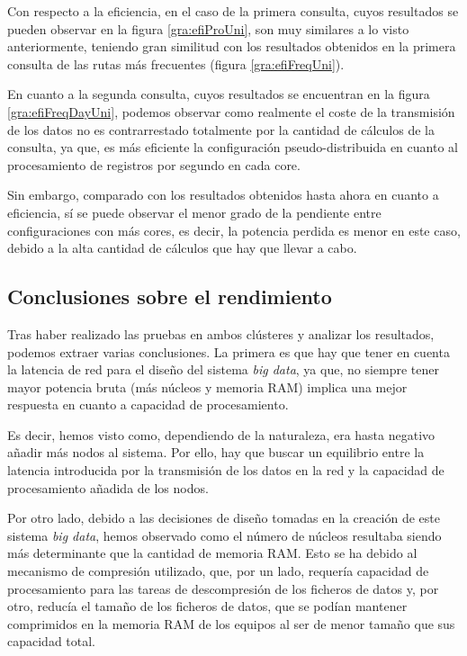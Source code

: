 Con respecto a la eficiencia, en el caso de la primera consulta, cuyos resultados se pueden observar en la figura \ref{gra:efiProUni}, son muy similares a lo visto anteriormente, teniendo gran similitud con los resultados obtenidos en la primera consulta de las rutas más frecuentes (figura \ref{gra:efiFreqUni}).

En cuanto a la segunda consulta, cuyos resultados se encuentran en la figura \ref{gra:efiFreqDayUni}, podemos observar como realmente el coste de la transmisión de los datos no es contrarrestado totalmente por la cantidad de cálculos de la consulta, ya que, es más eficiente la configuración pseudo-distribuida en cuanto al procesamiento de registros por segundo en cada core.

Sin embargo, comparado con los resultados obtenidos hasta ahora en cuanto a eficiencia, sí se puede observar el menor grado de la pendiente entre configuraciones con más cores, es decir, la potencia perdida es menor en este caso, debido a la alta cantidad de cálculos que hay que llevar a cabo.

\subsection{Conclusiones sobre el rendimiento}
Tras haber realizado las pruebas en ambos clústeres y analizar los resultados, podemos extraer varias conclusiones. La primera es que hay que tener en cuenta la latencia de red para el diseño del sistema \textit{big data}, ya que, no siempre tener mayor potencia bruta (más núcleos y memoria RAM) implica una mejor respuesta en cuanto a capacidad de procesamiento.

Es decir, hemos visto como, dependiendo de la naturaleza, era hasta negativo añadir más nodos al sistema. Por ello, hay que buscar un equilibrio entre la latencia introducida por la transmisión de los datos en la red y la capacidad de procesamiento añadida de los nodos.

Por otro lado, debido a las decisiones de diseño tomadas en la creación de este sistema \textit{big data}, hemos observado como el número de núcleos resultaba siendo más determinante que la cantidad de memoria \gls{RAM}. Esto se ha debido al mecanismo de compresión utilizado, que, por un lado, requería capacidad de procesamiento para las tareas de descompresión de los ficheros de datos y, por otro, reducía el tamaño de los ficheros de datos, que se podían mantener comprimidos en la memoria \gls{RAM} de los equipos al ser de menor tamaño que sus capacidad total.

